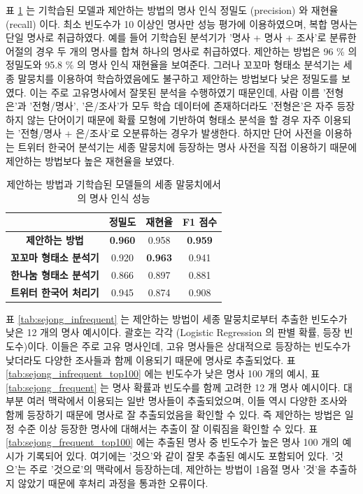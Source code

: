\documentclass[oneside, ko,phd]{snuthesis_utf8_kor}
\begin{document}
표 \ref{tab:sejong_performance} 는 기학습된 모델과 제안하는 방법의 명사 인식 정밀도 (precision) 와 재현율 (recall) 이다.
최소 빈도수가 10 이상인 명사만 성능 평가에 이용하였으며, 복합 명사는 단일 명사로 취급하였다.
예를 들어 기학습된 분석기가 '명사 + 명사 + 조사'로 분류한 어절의 경우 두 개의 명사를 합쳐 하나의 명사로 취급하였다.
제안하는 방법은 96 \% 의 정밀도와 95.8 \% 의 명사 인식 재현율을 보여준다.
그러나 꼬꼬마 형태소 분석기는 세종 말뭉치를 이용하여 학습하였음에도 불구하고 제안하는 방법보다 낮은 정밀도를 보였다.
이는 주로 고유명사에서 잘못된 분석을 수행하였기 때문인데, 사람 이름 '전형은'과 '전형/명사', '은/조사'가 모두 학습 데이터에 존재하더라도 '전형은'은 자주 등장하지 않는 단어이기 때문에 확률 모형에 기반하여 형태소 분석을 할 경우 자주 이용되는 '전형/명사 + 은/조사'로 오분류하는 경우가 발생한다.
하지만 단어 사전을 이용하는 트위터 한국어 분석기는 세종 말뭉치에 등장하는 명사 사전을 직접 이용하기 때문에 제안하는 방법보다 높은 재현율을 보였다.

\begin{table}[ht]
\centering
\caption{제안하는 방법과 기학습된 모델들의 세종 말뭉치에서의 명사 인식 성능}
\label{tab:sejong_performance}
\begin{tabular}{|
>{}c |c|c|c|}\hline
& \textbf{정밀도} & \textbf{재현율} & \textbf{F1 점수} \\ \hline
\textbf{제안하는 방법} & {\textbf{0.960}} & 0.958 & { \textbf{0.959}} \\ \hline
\textbf{꼬꼬마 형태소 분석기} & 0.920 & { \textbf{0.963}} & 0.941 \\ \hline
\textbf{한나눔 형태소 분석기} & 0.866 & 0.897 & 0.881 \\ \hline
\textbf{트위터 한국어 처리기} & 0.945 & 0.874 & 0.908 \\ \hline
\end{tabular}%
\end{table}

표 \ref{tab:sejong_infrequent} 는 제안하는 방법이 세종 말뭉치로부터 추출한 빈도수가 낮은 12 개의 명사 예시이다.
괄호는 각각 (Logistic Regression 의 판별 확률, 등장 빈도수)이다.
이들은 주로 고유 명사인데, 고유 명사들은 상대적으로 등장하는 빈도수가 낮더라도 다양한 조사들과 함께 이용되기 때문에 명사로 추출되었다.
표 \ref{tab:sejong_infrequent_top100} 에는 빈도수가 낮은 명사 100 개의 예시, 표 \ref{tab:sejong_frequent} 는 명사 확률과 빈도수를 함께 고려한 12 개 명사 예시이다.
대부분 여러 맥락에서 이용되는 일반 명사들이 추출되었으며, 이들 역시 다양한 조사와 함께 등장하기 때문에 명사로 잘 추출되었음을 확인할 수 있다.
즉 제안하는 방법은 일정 수준 이상 등장한 명사에 대해서는 추출이 잘 이뤄짐을 확인할 수 있다.
표 \ref{tab:sejong_frequent_top100} 에는 추출된 명사 중 빈도수가 높은 명사 100 개의 예시가 기록되어 있다.
여기에는 '것으'와 같이 잘못 추출된 예시도 포함되어 있다.
'것으'는 주로 '것으로'의 맥락에서 등장하는데, 제안하는 방법이 1음절 명사 '것'을 추출하지 않았기 때문에 후처리 과정을 통과한 오류이다.
\end{document}
